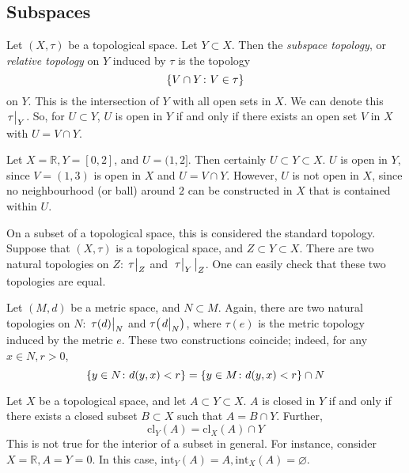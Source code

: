\subsection{Subspaces}
\begin{definition}
	Let \( (X, \tau) \) be a topological space.
	Let \( Y \subset X \).
	Then the \textit{subspace topology}, or \textit{relative topology} on \( Y \) induced by \( \tau \) is the topology
	\[
		\qty{ V \cap Y \colon V \in \tau }
	\]
	on \( Y \).
	This is the intersection of \( Y \) with all open sets in \( X \).
	We can denote this \( \eval{\tau}_Y \).
	So, for \( U \subset Y \), \( U \) is open in \( Y \) if and only if there exists an open set \( V \) in \( X \) with \( U = V \cap Y \).
\end{definition}
\begin{example}
	Let \( X = \mathbb R, Y = [0,2] \), and \( U = (1,2] \).
	Then certainly \( U \subset Y \subset X \).
	\( U \) is open in \( Y \), since \( V = (1,3) \) is open in \( X \) and \( U = V \cap Y \).
	However, \( U \) is not open in \( X \), since no neighbourhood (or ball) around \( 2 \) can be constructed in \( X \) that is contained within \( U \).
\end{example}
\begin{remark}
	On a subset of a topological space, this is considered the standard topology.
	Suppose that \( (X, \tau) \) is a topological space, and \( Z \subset Y \subset X \).
	There are two natural topologies on \( Z \): \( \eval{\tau}_Z \) and \( \eval{\eval{\tau}_Y}_Z \).
	One can easily check that these two topologies are equal.

	Let \( (M,d) \) be a metric space, and \( N \subset M \).
	Again, there are two natural topologies on \( N \): \( \eval{\tau(d)}_N \) and \( \tau\qty(\eval{d}_N) \), where \( \tau(e) \) is the metric topology induced by the metric \( e \).
	These two constructions coincide; indeed, for any \( x \in N, r > 0 \),
	\[
		\qty{y \in N \colon d(y,x) < r} = \qty{y \in M \colon d(y,x) < r} \cap N
	\]
\end{remark}
\begin{proposition}
	Let \( X \) be a topological space, and let \( A \subset Y \subset X \).
	\( A \) is closed in \( Y \) if and only if there exists a closed subset \( B \subset X \) such that \( A = B \cap Y \).
	Further,
	\[
		\mathrm{cl}_Y(A) = \mathrm{cl}_X(A) \cap Y
	\]
	This is not true for the interior of a subset in general.
	For instance, consider \( X = \mathbb R, A = Y = \qty{0} \).
	In this case, \( \mathrm{int}_Y(A) = A, \mathrm{int}_X(A) = \varnothing \).
\end{proposition}
